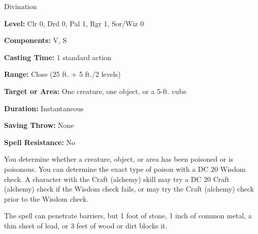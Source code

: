 
Divination

\textbf{Level:} Clr 0, Drd 0, Pal 1, Rgr 1, Sor/Wiz 0

\textbf{Components:} V, S

\textbf{Casting Time:} 1 standard action

\textbf{Range:} Close (25 ft. + 5 ft./2 levels)

\textbf{Target or Area:} One creature, one object, or a 5-ft. cube

\textbf{Duration:} Instantaneous

\textbf{Saving Throw:} None

\textbf{Spell Resistance:} No

You determine whether a creature, object, or area has been poisoned or is poisonous. 
You can determine the exact type of poison with a DC 20 Wisdom check. A character 
with the Craft (alchemy) skill may try a DC 20 Craft (alchemy) check if the Wisdom 
check fails, or may try the Craft (alchemy) check prior to the Wisdom check.

The spell can penetrate barriers, but 1 foot of stone, 1 inch of common metal, 
a thin sheet of lead, or 3 feet of wood or dirt blocks it.

